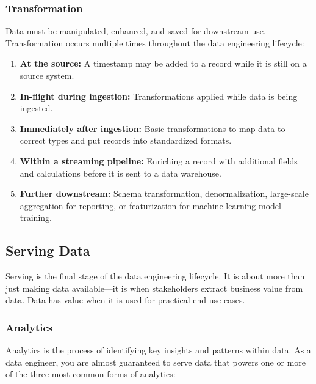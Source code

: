 \documentclass{article}
\begin{document}
\subsubsection{Transformation}
Data must be manipulated, enhanced, and saved for downstream use. Transformation occurs multiple times throughout the data engineering lifecycle:
\begin{enumerate}
    \item \textbf{At the source:} A timestamp may be added to a record while it is still on a source system.
    \item \textbf{In-flight during ingestion:} Transformations applied while data is being ingested.
    \item \textbf{Immediately after ingestion:} Basic transformations to map data to correct types and put records into standardized formats.
    \item \textbf{Within a streaming pipeline:} Enriching a record with additional fields and calculations before it is sent to a data warehouse.
    \item \textbf{Further downstream:} Schema transformation, denormalization, large-scale aggregation for reporting, or featurization for machine learning model training.
\end{enumerate}

\subsection{Serving Data}
Serving is the final stage of the data engineering lifecycle. It is about more than just making data available---it is when stakeholders extract business value from data. Data has value when it is used for practical end use cases.

\subsubsection{Analytics}
Analytics is the process of identifying key insights and patterns within data. As a data engineer, you are almost guaranteed to serve data that powers one or more of the three most common forms of analytics:
\end{document}
